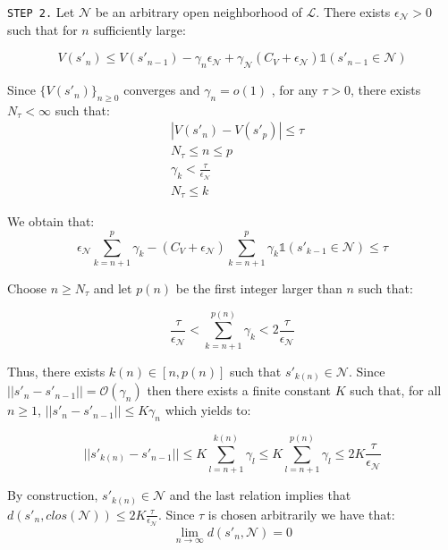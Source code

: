 \documentclass[a4paper]{article}
\theoremstyle{plain}
\newcommand{\indic}{\mathbb{1}}
\theoremstyle{plain}
\theoremstyle{definition}
\begin{document}
\begin{appendices}
{{{{\noindent \texttt{STEP 2.} Let $\mathcal{N}$ be an arbitrary open neighborhood of $\mathcal{L}$. There exists $\epsilon_{\mathcal{N}} > 0$ such that for $n$ sufficiently large:

\begin{equation}\label{lyap_io}
V(s'_n) \leq V(s'_{n-1}) - \gamma_n \epsilon_{\mathcal{N}} + \gamma_{\mathcal{N}} (C_V +\epsilon_{\mathcal{N}})\indic(s'_{n-1} \in\mathcal{N})
\end{equation}

Since $\{V(s'_n)\}_{n \geq 0}$ converges and $\gamma_n = o(1)$
, for any $\tau > 0$, there exists $N_{\tau} < \infty$ such that:
\begin{equation}
\begin{split}
& |V(s'_n) -V(s'_p)| \leq \tau \\
& N_{\tau} \leq n \leq p \\
& \gamma_k < \frac{\tau}{\epsilon_{\mathcal{N}}}\\
& N_{\tau} \leq k
\end{split}
\end{equation}

We obtain that:
\begin{equation}
\epsilon_{\mathcal{N}} \sum_{k=n+1}^{p}{\gamma_k - (C_V +\epsilon_{\mathcal{N}})}\sum_{k=n+1}^{p}{\gamma_k \indic(s'_{k-1} \in\mathcal{N})} \leq \tau
\end{equation}

Choose $n \geq N_{\tau}$ and let $p(n)$ be the first integer larger than $n$ such that:

\begin{equation}
\frac{\tau}{\epsilon_{\mathcal{N}}} <  \sum_{k=n+1}^{p(n)}{\gamma_k}< 2\frac{\tau}{\epsilon_{\mathcal{N}}}
\end{equation}

Thus, there exists $k(n) \in [n, p(n)]$ such that $s'_{k(n)} \in \mathcal{N}$.
Since $||s'_n - s'_{n-1}|| = \mathcal{O}(\gamma_n )$ then there exists a finite constant $K$ such that, for all $n \geq 1$, $||s'_n - s'_{n-1}|| \leq K \gamma_n$ which yields to:

\begin{equation}
||s'_{k(n)} - s'_{n-1}|| \leq K \sum_{l=n+1}^{k(n)}{\gamma_l}\leq K \sum_{l=n+1}^{p(n)}{\gamma_l} \leq 2K \frac{\tau}{\epsilon_{\mathcal{N}}}
\end{equation}

By construction, $s'_{k(n)} \in \mathcal{N}$ and the last relation implies that $d(s'_n, clos(\mathcal{N})) \leq 2K \frac{\tau}{\epsilon_{\mathcal{N}}}$. Since $\tau$ is chosen arbitrarily we have that:
\begin{equation}
\lim \limits_{n \to \infty} d(s'_n, \mathcal{N}) = 0
\end{equation}

}}}}
\end{appendices}
\end{document}

